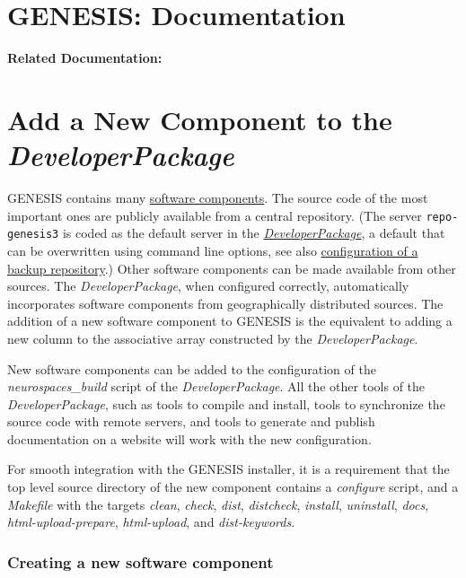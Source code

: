 \documentclass[12pt]{article}
\begin{document}
\section*{GENESIS: Documentation}

{\bf Related Documentation:}

\section*{Add a New Component to the {\it DeveloperPackage}}

GENESIS contains many
\href{../genesis-components/genesis-components.tex}{software
  components}. The source code of the most important ones are publicly
available from a central repository. (The server {\tt repo-genesis3}
is coded as the default server in the
\href{../developer-package/developer-package.tex}{\it
  DeveloperPackage}, a default that can be overwritten using command
line options, see also
\href{../backup-repository/backup-repository.tex}{configuration of a
  backup repository}.) Other software components can be made available
from other sources. The {\it DeveloperPackage}, when configured
correctly, automatically incorporates software components from
geographically distributed sources. The addition of a new software
component to GENESIS is the equivalent to adding a new column to the
associative array constructed by the {\it DeveloperPackage}.

New software components can be added to the configuration of the {\it
  neurospaces\_build} script of the {\it DeveloperPackage}. All the other tools of the
{\it DeveloperPackage}, such as tools to compile and install, tools to synchronize
the source code with remote servers, and tools to generate and publish
documentation on a website will work with the new configuration.

For smooth integration with the GENESIS installer, it is a requirement that the top level source directory of the new component contains a {\it configure} script, and a {\it Makefile} with the targets {\it clean}, {\it check}, {\it dist}, {\it distcheck}, {\it install}, {\it uninstall}, {\it docs}, {\it html-upload-prepare}, {\it html-upload}, and {\it dist-keywords}.

\subsubsection*{Creating a new software component}
\end{document}
